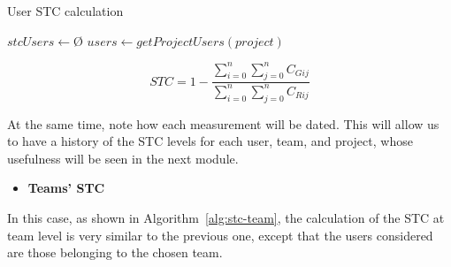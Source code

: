 \begin{algorithm}
    
    \DontPrintSemicolon
    
    \caption{User STC calculation}
    \label{alg:stc-user}
        
        $stcUsers \longleftarrow $\O$ $\;
        $users \longleftarrow getProjectUsers(project)$\;
        
        
\end{algorithm}


\begin{equation}
\label{eq:stc-user}
STC = 1 - \frac{\sum_{i=0}^{n}\sum_{j=0}^{n}C_{Gij}}{\sum_{i=0}^{n}\sum_{j=0}^{n}C_{Rij}}
\end{equation}

At the same time, note how each measurement will be dated. This will allow us to have a history of the STC levels for each user, team, and project, whose usefulness will be seen in the next module.

\begin{itemize}
\item \textbf{Teams' STC}
\end{itemize}

In this case, as shown in Algorithm~\ref{alg:stc-team}, the calculation of the STC at team level is very similar to the previous one, except that the users considered are those belonging to the chosen team.

